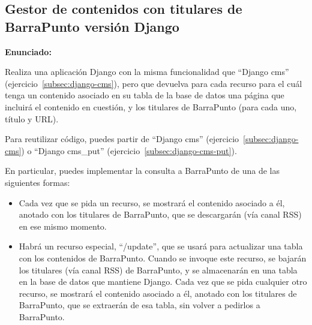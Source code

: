 \subsection{Gestor de contenidos con titulares de BarraPunto versión Django}
\label{subsec:django-cms-barrapunto}

\textbf{Enunciado:}


Realiza una aplicación Django con la misma funcionalidad que ``Django cms'' (ejercicio~\ref{subsec:django-cms}), pero que devuelva para cada recurso para el cuál tenga un contenido asociado en su tabla de la base de datos una página que incluirá el contenido en cuestión, y los titulares de BarraPunto (para cada uno, título y URL).


Para reutilizar código, puedes partir de ``Django cms'' (ejercicio~\ref{subsec:django-cms}) o  ``Django cms\_put'' (ejercicio~\ref{subsec:django-cms-put}).

En particular, puedes implementar la consulta a BarraPunto de una de las siguientes formas:

\begin{itemize}
\item Cada vez que se pida un recurso, se mostrará el contenido asociado a él, anotado con los titulares de BarraPunto, que se descargarán (vía canal RSS) en ese mismo momento.
\item Habrá un recurso especial, ``/update'', que se usará para actualizar una tabla con los contenidos de BarraPunto. Cuando se invoque este recurso, se bajarán los titulares (vía canal RSS) de BarraPunto, y se almacenarán en una tabla en la base de datos que mantiene Django. Cada vez que se pida cualquier otro recurso, se mostrará el contenido asociado a él, anotado con los titulares de BarraPunto, que se extraerán de esa tabla, sin volver a pedirlos a BarraPunto.
\end{itemize}

